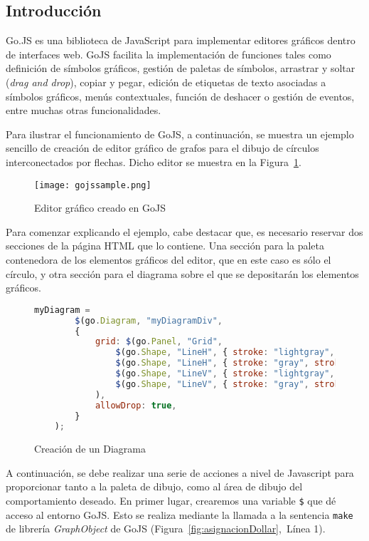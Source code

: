 \subsection{Introducción}

Go.JS \cite{gojs} es una biblioteca de JavaScript para implementar editores gráficos dentro de interfaces web. GoJS facilita la implementación de funciones tales como definición de símbolos gráficos, gestión de paletas de símbolos, arrastrar y soltar (\emph{drag and drop}), copiar y pegar, edición de etiquetas de texto asociadas a símbolos gráficos, menús contextuales, función de deshacer o gestión de eventos, entre muchas otras funcionalidades.

Para ilustrar el funcionamiento de GoJS, a continuación, se muestra un ejemplo sencillo de creación de editor gráfico de grafos para el dibujo de círculos interconectados por flechas. Dicho editor se muestra en la Figura~\ref{fig:gojssample}.

\begin{figure}[!tb]
	\centering
	\texttt{[image: gojssample.png]}
	\caption{Editor gráfico creado en GoJS}
    \label{fig:gojssample}
\end{figure}

Para comenzar explicando el ejemplo, cabe destacar que, es necesario reservar dos secciones de la página HTML que lo contiene. Una sección para la paleta contenedora de los elementos gráficos del editor, que en este caso es sólo el círculo, y otra sección para el diagrama sobre el que se depositarán los elementos gráficos. 


\begin{figure}[!tb]
	\centering
	\begin{lstlisting}[language=JavaScript]
	myDiagram =
		$(go.Diagram, "myDiagramDiv",  
		{
			grid: $(go.Panel, "Grid",
				$(go.Shape, "LineH", { stroke: "lightgray", strokeWidth: 0.5 }),
				$(go.Shape, "LineH", { stroke: "gray", strokeWidth: 0.5, interval: 10 }),
				$(go.Shape, "LineV", { stroke: "lightgray", strokeWidth: 0.5 }),
				$(go.Shape, "LineV", { stroke: "gray", strokeWidth: 0.5, interval: 10 })
			),
			allowDrop: true,         
		}
	);
	\end{lstlisting}
	\caption{Creación de un Diagrama}
	\label{fig:creacionDiagrama}
\end{figure}



A continuación, se debe realizar una serie de acciones a nivel de Javascript para proporcionar tanto a la paleta de dibujo, como al área de dibujo del comportamiento deseado. En primer lugar, crearemos una variable \texttt{\$} que dé acceso al entorno GoJS. Esto se realiza mediante la llamada a la sentencia \texttt{make} de librería \emph{GraphObject} de GoJS (Figura~\ref{fig:asignacionDollar},~Línea 1).

